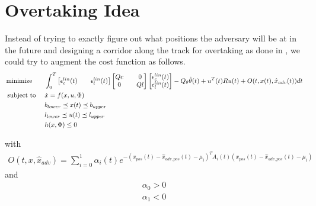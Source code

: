 \documentclass[12pt]{article}
\begin{document}
\section{Overtaking Idea}
Instead of trying to exactly figure out what positions the adversary will be at in the future and designing a corridor along the track for overtaking as done in \cite{liniger2015optimization}, we could try to augment the cost function as follows. 
\begin{align}
\begin{aligned}
&\mathop{\text{minimize }} &&\int_{0}^{T}\begin{bmatrix}
\epsilon_c^{lin}(t)&&\epsilon_l^{lin}(t)
\end{bmatrix}
\begin{bmatrix}
Qc&&0\\0&&Ql
\end{bmatrix}
\begin{bmatrix}
\epsilon_c^{lin}(t)\\
\epsilon_l^{lin}(t)
\end{bmatrix} - Q_{\theta}\dot{\theta}(t) + u^T(t) R u(t) + O(t,x(t), \hat{x}_{adv}(t))dt\\
&\text{ subject to }  &&\dot{x} = f(x,u,\Phi)\\
&&& b_{lower}\preceq x(t) \preceq b_{upper}\\
&&& l_{lower}\preceq u(t) \preceq l_{upper}\\
&&& h(x, \Phi) \leq 0
\end{aligned}
\end{align}

with 
\begin{align}\label{eqn:bump}
O(t, x, \hat{x}_{adv}) =\sum_{i = 0}^{1} \alpha_i(t)e^{-(x_{pos}(t)-\hat{x}_{adv, pos}(t)-\mu_i)^TA_i(t)(x_{pos}(t)-\hat{x}_{adv, pos}(t)-\mu_i)}
\end{align}
and
\begin{align}
\alpha_0 > 0\\
\alpha_1<0
\end{align}
\end{document}
